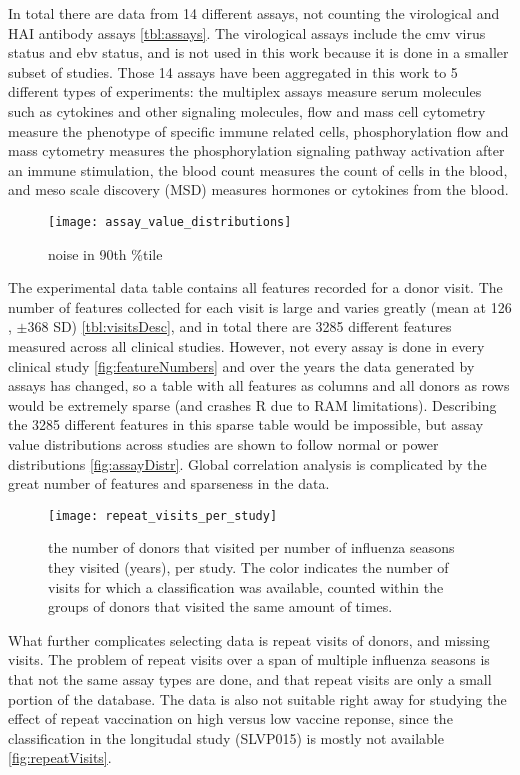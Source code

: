 In total there are data from 14 different assays, not counting the virological
and HAI antibody assays \autoref{tbl:assays}. The virological assays include
the cmv virus status and ebv status, and is not used in this work because it is
done in a smaller subset of studies. Those 14 assays have been aggregated in
this work to 5 different types of experiments: the multiplex assays measure
serum molecules such as cytokines and other signaling molecules, flow and mass
cell cytometry measure the phenotype of specific immune related cells,
phosphorylation flow and mass cytometry measures the phosphorylation signaling
pathway activation after an immune stimulation, the blood count measures the
count of cells in the blood, and meso scale discovery (MSD) measures hormones
or cytokines from the blood.

\begin{figure}
    \texttt{[image: assay\_value\_distributions]}
    \caption{noise in 90th \%tile}\label{fig:assayDistr}
\end{figure}

The experimental data table contains all features recorded for a donor visit.
The number of features collected for each visit is large and varies greatly
(mean at 126 , \(\pm \)368 SD) \autoref{tbl:visitsDesc}, and in total there are
3285 different features measured across all clinical studies. However, not
every assay is done in every clinical study \autoref{fig:featureNumbers} and
over the years the data generated by assays has changed, so a table with all
features as columns and all donors as rows would be extremely sparse (and
crashes R due to RAM limitations).  Describing the 3285 different
features in this sparse table would be impossible, but assay value
distributions across studies are shown to follow normal or power distributions
\autoref{fig:assayDistr}. Global correlation analysis is complicated by the
great number of features and sparseness in the data.

\begin{figure}
    \texttt{[image: repeat\_visits\_per\_study]}
    \caption{the number of donors that visited per number of influenza seasons
    they visited (years), per study. The color indicates the number of visits for which a
    classification was available, counted within the groups of donors that
    visited the same amount of times.}\label{fig:repeatVisits}
\end{figure}

What further complicates selecting data is repeat visits of donors, and missing
visits. The problem of repeat visits over a span of multiple influenza seasons
is that not the same assay types are done, and that repeat visits are only a
small portion of the database. The data is also not suitable right away for
studying the effect of repeat vaccination on high versus low vaccine reponse,
since the classification in the longitudal study (SLVP015) is mostly not
available \autoref{fig:repeatVisits}.

